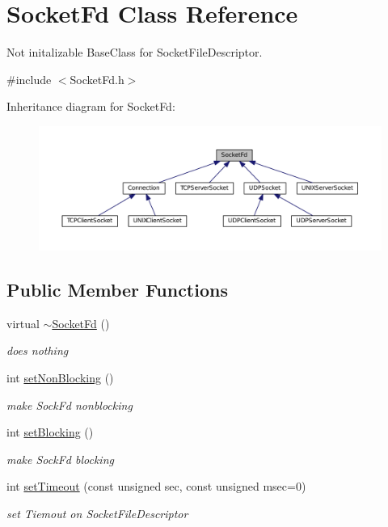 \hypertarget{classSocketFd}{\section{Socket\+Fd Class Reference}
\label{classSocketFd}
}


Not initalizable Base\+Class for Socket\+File\+Descriptor.  




{\ttfamily \#include $<$Socket\+Fd.\+h$>$}



Inheritance diagram for Socket\+Fd\+:
\nopagebreak
\begin{figure}[H]
\begin{center}
\leavevmode
\includegraphics[width=350pt]{classSocketFd__inherit__graph}
\end{center}
\end{figure}
\subsection*{Public Member Functions}
\begin{DoxyCompactItemize}
\item 
virtual \hyperlink{classSocketFd_add3bcd5016a045da6ecccdfd4c97ee3f}{$\sim$\+Socket\+Fd} ()
\begin{DoxyCompactList}\small\item\em does nothing \end{DoxyCompactList}\item 
int \hyperlink{classSocketFd_a38ae432100f8df6e99e0145a793d4693}{set\+Non\+Blocking} ()
\begin{DoxyCompactList}\small\item\em make Sock\+Fd nonblocking \end{DoxyCompactList}\item 
int \hyperlink{classSocketFd_a0ebb54cefc45ab8e06472fb14e92c9e0}{set\+Blocking} ()
\begin{DoxyCompactList}\small\item\em make Sock\+Fd blocking \end{DoxyCompactList}\item 
int \hyperlink{classSocketFd_a9b3ed5d1b4e34195fd53ae8a627187aa}{set\+Timeout} (const unsigned sec, const unsigned msec=0)
\begin{DoxyCompactList}\small\item\em set Tiemout on Socket\+File\+Descriptor \end{DoxyCompactList}\end{DoxyCompactItemize}
